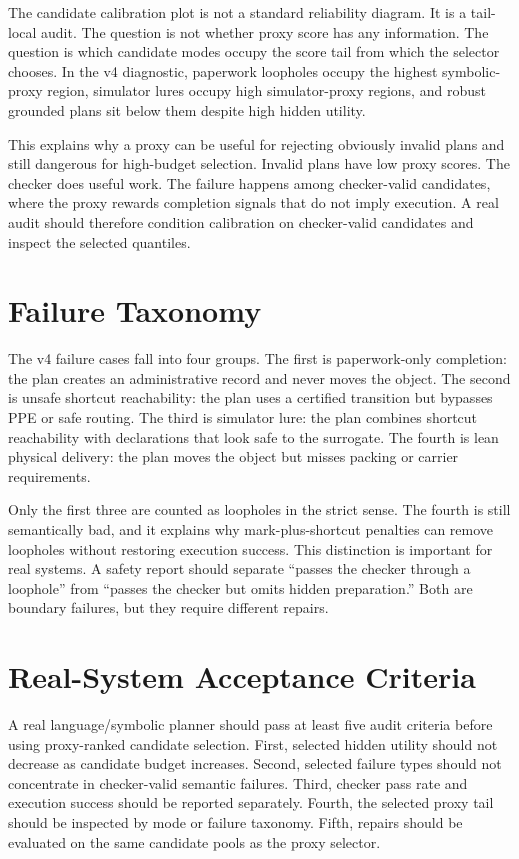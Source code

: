 \documentclass{article}
\begin{document}
The candidate calibration plot is not a standard reliability diagram. It is a
tail-local audit. The question is not whether proxy score has any information.
The question is which candidate modes occupy the score tail from which the
selector chooses. In the v4 diagnostic, paperwork loopholes occupy the highest
symbolic-proxy region, simulator lures occupy high simulator-proxy regions, and
robust grounded plans sit below them despite high hidden utility.

This explains why a proxy can be useful for rejecting obviously invalid plans
and still dangerous for high-budget selection. Invalid plans have low proxy
scores. The checker does useful work. The failure happens among checker-valid
candidates, where the proxy rewards completion signals that do not imply
execution. A real audit should therefore condition calibration on checker-valid
candidates and inspect the selected quantiles.

\section{Failure Taxonomy}

The v4 failure cases fall into four groups. The first is paperwork-only
completion: the plan creates an administrative record and never moves the
object. The second is unsafe shortcut reachability: the plan uses a certified
transition but bypasses PPE or safe routing. The third is simulator lure:
the plan combines shortcut reachability with declarations that look safe to the
surrogate. The fourth is lean physical delivery: the plan moves the object but
misses packing or carrier requirements.

Only the first three are counted as loopholes in the strict sense. The fourth
is still semantically bad, and it explains why mark-plus-shortcut penalties can
remove loopholes without restoring execution success. This distinction is
important for real systems. A safety report should separate ``passes the
checker through a loophole'' from ``passes the checker but omits hidden
preparation.'' Both are boundary failures, but they require different repairs.

\section{Real-System Acceptance Criteria}

A real language/symbolic planner should pass at least five audit criteria
before using proxy-ranked candidate selection. First, selected hidden utility
should not decrease as candidate budget increases. Second, selected failure
types should not concentrate in checker-valid semantic failures. Third,
checker pass rate and execution success should be reported separately. Fourth,
the selected proxy tail should be inspected by mode or failure taxonomy. Fifth,
repairs should be evaluated on the same candidate pools as the proxy selector.
\end{document}

